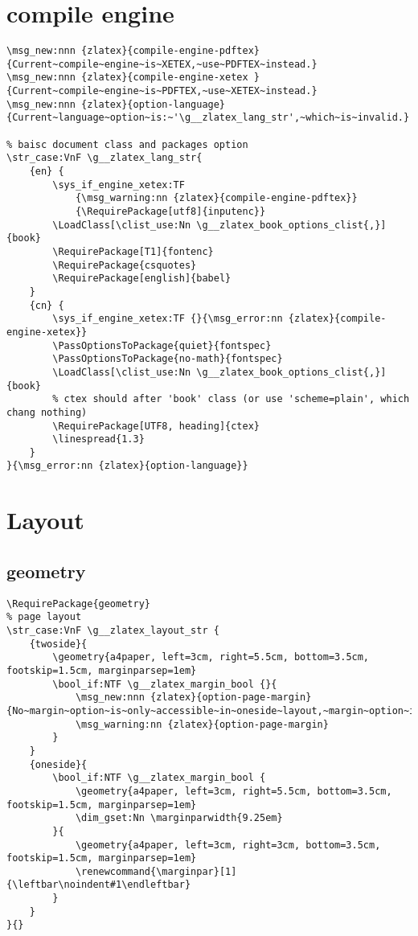 \section{compile engine}
\begin{verbatim}
\msg_new:nnn {zlatex}{compile-engine-pdftex}{Current~compile~engine~is~XETEX,~use~PDFTEX~instead.}
\msg_new:nnn {zlatex}{compile-engine-xetex }{Current~compile~engine~is~PDFTEX,~use~XETEX~instead.}
\msg_new:nnn {zlatex}{option-language}{Current~language~option~is:~'\g__zlatex_lang_str',~which~is~invalid.}

% baisc document class and packages option
\str_case:VnF \g__zlatex_lang_str{
    {en} { 
        \sys_if_engine_xetex:TF 
            {\msg_warning:nn {zlatex}{compile-engine-pdftex}}
            {\RequirePackage[utf8]{inputenc}}
        \LoadClass[\clist_use:Nn \g__zlatex_book_options_clist{,}]{book} 
        \RequirePackage[T1]{fontenc}
        \RequirePackage{csquotes}
        \RequirePackage[english]{babel} 
    }
    {cn} {
        \sys_if_engine_xetex:TF {}{\msg_error:nn {zlatex}{compile-engine-xetex}}
        \PassOptionsToPackage{quiet}{fontspec}
        \PassOptionsToPackage{no-math}{fontspec}
        \LoadClass[\clist_use:Nn \g__zlatex_book_options_clist{,}]{book}
        % ctex should after 'book' class (or use 'scheme=plain', which chang nothing)
        \RequirePackage[UTF8, heading]{ctex}
        \linespread{1.3}
    }
}{\msg_error:nn {zlatex}{option-language}}  
\end{verbatim}

\section{Layout}
\subsection{geometry}
\begin{verbatim}
\RequirePackage{geometry}
% page layout 
\str_case:VnF \g__zlatex_layout_str {
    {twoside}{
        \geometry{a4paper, left=3cm, right=5.5cm, bottom=3.5cm, footskip=1.5cm, marginparsep=1em}
        \bool_if:NTF \g__zlatex_margin_bool {}{
            \msg_new:nnn {zlatex}{option-page-margin}{No~margin~option~is~only~accessible~in~oneside~layout,~margin~option~is~now~enabled~by~default.} 
            \msg_warning:nn {zlatex}{option-page-margin}
        }
    }
    {oneside}{
        \bool_if:NTF \g__zlatex_margin_bool {
            \geometry{a4paper, left=3cm, right=5.5cm, bottom=3.5cm, footskip=1.5cm, marginparsep=1em}
            \dim_gset:Nn \marginparwidth{9.25em}
        }{
            \geometry{a4paper, left=3cm, right=3cm, bottom=3.5cm, footskip=1.5cm, marginparsep=1em}
            \renewcommand{\marginpar}[1]{\leftbar\noindent#1\endleftbar}
        }
    }
}{}
\end{verbatim}

